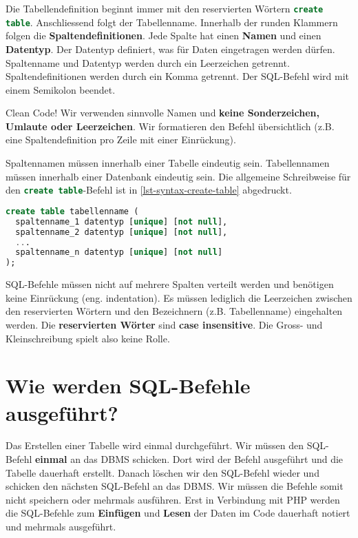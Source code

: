 Die Tabellendefinition beginnt immer mit den reservierten Wörtern \lstinline[language=sql]{create table}. Anschliessend folgt der Tabellenname. Innerhalb der runden Klammern folgen die \textbf{Spaltendefinitionen}. Jede Spalte hat einen \textbf{Namen} und einen \textbf{Datentyp}. Der Datentyp definiert, was für Daten eingetragen werden dürfen. Spaltenname und Datentyp werden durch ein Leerzeichen getrennt. Spaltendefinitionen werden durch ein Komma getrennt. Der \ac{SQL}-Befehl wird mit einem Semikolon beendet.

\begin{important}
Clean Code! Wir verwenden sinnvolle Namen und \textbf{keine Sonderzeichen, Umlaute oder Leerzeichen}. Wir formatieren den Befehl übersichtlich (z.B. eine Spaltendefinition pro Zeile mit einer Einrückung).
\end{important}

Spaltennamen müssen innerhalb einer Tabelle eindeutig sein. Tabellennamen müssen innerhalb einer Datenbank eindeutig sein. Die allgemeine Schreibweise für den \lstinline[language=sql]{create table}-Befehl ist in \autoref{lst-syntax-create-table} abgedruckt.

\begin{lstlisting}[language=SQL, morekeywords={real, text}, caption={Die letzte Spaltendefinition besitzt \textbf{kein} Komma am Ende. Die eckigen Klammern bedeuten, dass die Angabe optional ist und somit weggelassen werden kann.}, label={lst-syntax-create-table}]
create table tabellenname (
  spaltenname_1 datentyp [unique] [not null],
  spaltenname_2 datentyp [unique] [not null],
  ...
  spaltenname_n datentyp [unique] [not null]
);
\end{lstlisting}

\begin{hinweis}
\ac{SQL}-Befehle müssen nicht auf mehrere Spalten verteilt werden und benötigen keine Einrückung (eng. indentation). Es müssen lediglich die Leerzeichen zwischen den reservierten Wörtern und den Bezeichnern (z.B. Tabellenname) eingehalten werden. Die \textbf{reservierten Wörter} sind \textbf{case insensitive}. Die Gross- und Kleinschreibung spielt also keine Rolle.
\end{hinweis}

\section{Wie werden \acs{SQL}-Befehle ausgeführt?}

Das Erstellen einer Tabelle wird einmal durchgeführt. Wir müssen den \ac{SQL}-Befehl \textbf{einmal} an das \ac{DBMS} schicken. Dort wird der Befehl ausgeführt und die Tabelle dauerhaft erstellt. Danach löschen wir den \ac{SQL}-Befehl wieder und schicken den nächsten \ac{SQL}-Befehl an das \ac{DBMS}. Wir müssen die Befehle somit nicht speichern oder mehrmals ausführen. Erst in Verbindung mit \ac{PHP} werden die \ac{SQL}-Befehle zum \textbf{Einfügen} und \textbf{Lesen} der Daten im Code dauerhaft notiert und mehrmals ausgeführt.

